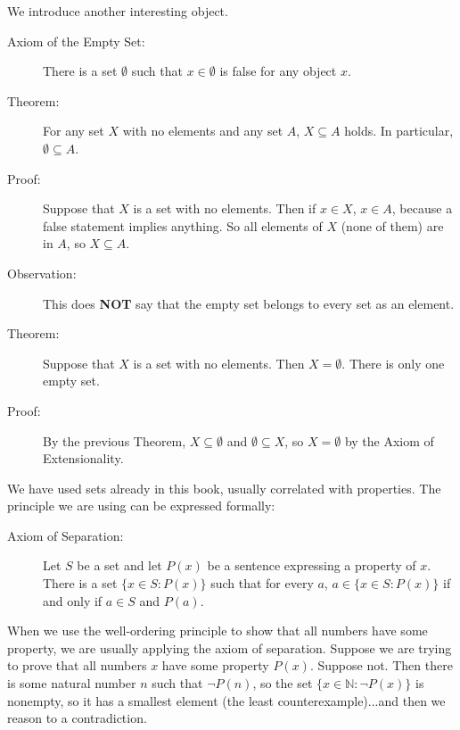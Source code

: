 \documentclass[12pt]{article}
\begin{document}
We introduce another interesting object.

\begin{description}

\item[Axiom of the Empty Set:]  There is a set $\emptyset$ such that $x \in \emptyset$ is false for any object $x$.

\item[Theorem:]  For any set $X$ with no elements and any set $A$, $X \subseteq A$ holds.  In particular, $\emptyset \subseteq A$.

\item[Proof:]  Suppose that $X$ is a set with no elements.  Then if $x \in X$, $x \in A$, because a false statement implies anything.  So all elements of $X$ (none of them) are in $A$, so $X \subseteq A$.

\item[Observation:]  This does {\bf NOT} say that the empty set belongs to every set as an element.

\item[Theorem:]  Suppose that $X$ is a set with no elements.  Then $X = \emptyset$.  There is only one empty set.

\item[Proof:]  By the previous Theorem, $X \subseteq \emptyset$ and $\emptyset \subseteq X$, so $X = \emptyset$ by the Axiom of Extensionality.

\end{description}

We have used sets already in this book, usually correlated with properties.  The principle we are using can be expressed formally:

\begin{description}

\item[Axiom of Separation:]  Let $S$ be a set and let $P(x)$ be a sentence expressing a property of $x$.  There is a set $\{x \in S:P(x)\}$ such that for every $a$, $a \in \{x \in S:P(x)\}$ if and only if $a \in S$ and $P(a)$.

\end{description}

When we use the well-ordering principle to show that all numbers have some property, we are usually applying the axiom of separation.   Suppose we are trying to prove that all numbers $x$ have some property $P(x)$.  Suppose not.  Then there is some natural number $n$ such that $\neg P(n)$, so the set $\{x \in {\mathbb N}:\neg P(x)\}$ is nonempty, so it has a smallest element (the least counterexample)...and then we reason to a contradiction.
\end{document}
